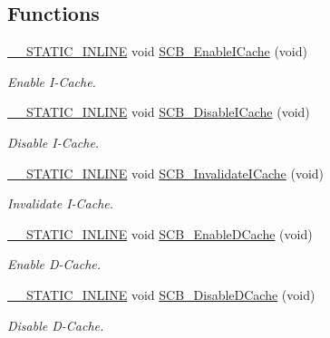 \subsection*{Functions}
\begin{DoxyCompactItemize}
\item 
\hyperlink{cmsis__iccarm_8h_aba87361bfad2ae52cfe2f40c1a1dbf9c}{\+\_\+\+\_\+\+S\+T\+A\+T\+I\+C\+\_\+\+I\+N\+L\+I\+NE} void \hyperlink{group___c_m_s_i_s___core___cache_functions_gaf9e7c6c8e16ada1f95e5bf5a03505b68}{S\+C\+B\+\_\+\+Enable\+I\+Cache} (void)
\begin{DoxyCompactList}\small\item\em Enable I-\/\+Cache. \end{DoxyCompactList}\item 
\hyperlink{cmsis__iccarm_8h_aba87361bfad2ae52cfe2f40c1a1dbf9c}{\+\_\+\+\_\+\+S\+T\+A\+T\+I\+C\+\_\+\+I\+N\+L\+I\+NE} void \hyperlink{group___c_m_s_i_s___core___cache_functions_gaba757390852f95b3ac2d8638c717d8d8}{S\+C\+B\+\_\+\+Disable\+I\+Cache} (void)
\begin{DoxyCompactList}\small\item\em Disable I-\/\+Cache. \end{DoxyCompactList}\item 
\hyperlink{cmsis__iccarm_8h_aba87361bfad2ae52cfe2f40c1a1dbf9c}{\+\_\+\+\_\+\+S\+T\+A\+T\+I\+C\+\_\+\+I\+N\+L\+I\+NE} void \hyperlink{group___c_m_s_i_s___core___cache_functions_ga50d373a785edd782c5de5a3b55e30ff3}{S\+C\+B\+\_\+\+Invalidate\+I\+Cache} (void)
\begin{DoxyCompactList}\small\item\em Invalidate I-\/\+Cache. \end{DoxyCompactList}\item 
\hyperlink{cmsis__iccarm_8h_aba87361bfad2ae52cfe2f40c1a1dbf9c}{\+\_\+\+\_\+\+S\+T\+A\+T\+I\+C\+\_\+\+I\+N\+L\+I\+NE} void \hyperlink{group___c_m_s_i_s___core___cache_functions_ga63aa640d9006021a796a5dcf9c7180b6}{S\+C\+B\+\_\+\+Enable\+D\+Cache} (void)
\begin{DoxyCompactList}\small\item\em Enable D-\/\+Cache. \end{DoxyCompactList}\item 
\hyperlink{cmsis__iccarm_8h_aba87361bfad2ae52cfe2f40c1a1dbf9c}{\+\_\+\+\_\+\+S\+T\+A\+T\+I\+C\+\_\+\+I\+N\+L\+I\+NE} void \hyperlink{group___c_m_s_i_s___core___cache_functions_ga6468170f90d270caab8116e7a4f0b5fe}{S\+C\+B\+\_\+\+Disable\+D\+Cache} (void)
\begin{DoxyCompactList}\small\item\em Disable D-\/\+Cache. \end{DoxyCompactList}\item 

\end{DoxyCompactItemize}
